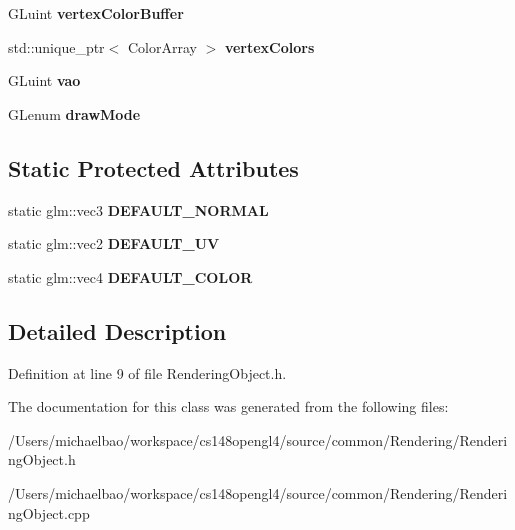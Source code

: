 \begin{DoxyCompactItemize}
\item 
\hypertarget{class_rendering_object_aeb014a4ef24e2fc4665a769241660cad}{}G\+Luint {\bfseries vertex\+Color\+Buffer}\label{class_rendering_object_aeb014a4ef24e2fc4665a769241660cad}

\item 
\hypertarget{class_rendering_object_a65fc52e665791ce55e43106b603e917a}{}std\+::unique\+\_\+ptr$<$ Color\+Array $>$ {\bfseries vertex\+Colors}\label{class_rendering_object_a65fc52e665791ce55e43106b603e917a}

\item 
\hypertarget{class_rendering_object_a96dd05670a977a949514a2c490c1c867}{}G\+Luint {\bfseries vao}\label{class_rendering_object_a96dd05670a977a949514a2c490c1c867}

\item 
\hypertarget{class_rendering_object_aa67856a72705b54a5667e91e270d00b3}{}G\+Lenum {\bfseries draw\+Mode}\label{class_rendering_object_aa67856a72705b54a5667e91e270d00b3}

\end{DoxyCompactItemize}
\subsection*{Static Protected Attributes}
\begin{DoxyCompactItemize}
\item 
\hypertarget{class_rendering_object_af270a476ba12c23fefbb034e21930add}{}static glm\+::vec3 {\bfseries D\+E\+F\+A\+U\+L\+T\+\_\+\+N\+O\+R\+M\+A\+L}\label{class_rendering_object_af270a476ba12c23fefbb034e21930add}

\item 
\hypertarget{class_rendering_object_a3dcb28a12f578630aea75cc59ea39588}{}static glm\+::vec2 {\bfseries D\+E\+F\+A\+U\+L\+T\+\_\+\+U\+V}\label{class_rendering_object_a3dcb28a12f578630aea75cc59ea39588}

\item 
\hypertarget{class_rendering_object_a3bf21996dc0ef604b2b81d95275c97f9}{}static glm\+::vec4 {\bfseries D\+E\+F\+A\+U\+L\+T\+\_\+\+C\+O\+L\+O\+R}\label{class_rendering_object_a3bf21996dc0ef604b2b81d95275c97f9}

\end{DoxyCompactItemize}


\subsection{Detailed Description}


Definition at line 9 of file Rendering\+Object.\+h.



The documentation for this class was generated from the following files\+:\begin{DoxyCompactItemize}
\item 
/\+Users/michaelbao/workspace/cs148opengl4/source/common/\+Rendering/Rendering\+Object.\+h\item 
/\+Users/michaelbao/workspace/cs148opengl4/source/common/\+Rendering/Rendering\+Object.\+cpp\end{DoxyCompactItemize}

